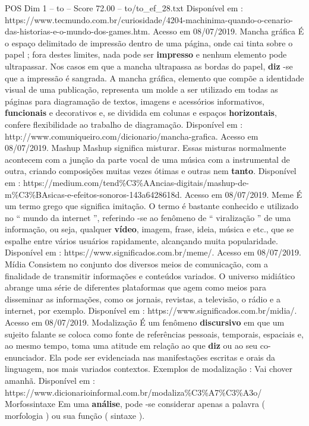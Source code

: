 \begin{textsample}{POS Dim 1 – to – Score 72.00 – to/to\_ef\_28.txt}
Disponível em : https://www.tecmundo.com.br/curiosidade/4204-machinima-quando-o-cenario-das-historias-e-o-mundo-dos-games.htm.
Acesso em 08/07/2019.
Mancha gráfica É o espaço delimitado de impressão dentro de uma página, onde cai tinta sobre o papel ; fora destes limites, nada pode ser \textbf{impresso} e nenhum elemento pode ultrapassar.
Nos casos em que a mancha ultrapassa as bordas do papel, \textbf{diz} -se que a impressão é sangrada.
A mancha gráfica, elemento que compõe a identidade visual de uma publicação, representa um molde a ser utilizado em todas as páginas para diagramação de textos, imagens e acessórios informativos, \textbf{funcionais} e decorativos e, se dividida em colunas e espaços \textbf{horizontais}, confere flexibilidade ao trabalho de diagramação.
Disponível em : http://www.comuniqueiro.com/dicionario/mancha-grafica.
Acesso em 08/07/2019.
Mashup Mashup significa misturar.
Essas misturas normalmente acontecem com a junção da parte vocal de uma música com a instrumental de outra, criando composições muitas vezes ótimas e outras nem \textbf{tanto}.
Disponível em : https://medium.com/tend\%C3\%AAncias-digitais/mashup-de-m\%C3\%BAsicas-e-efeitos-sonoros-143a6428618d.
Acesso em 08/07/2019.
Meme É um termo grego que significa imitação.
O termo é bastante conhecido e utilizado no “ mundo da internet ”, referindo -se ao fenômeno de “ viralização ” de uma informação, ou seja, qualquer \textbf{vídeo}, imagem, frase, ideia, música e etc., que se espalhe entre vários usuários rapidamente, alcançando muita popularidade.
Disponível em : https://www.significados.com.br/meme/.
Acesso em 08/07/2019.
Mídia Consistem no conjunto dos diversos meios de comunicação, com a finalidade de transmitir informações e conteúdos variados.
O universo midiático abrange uma série de diferentes plataformas que agem como meios para disseminar as informações, como os jornais, revistas, a televisão, o rádio e a internet, por exemplo.
Disponível em : https://www.significados.com.br/midia/.
Acesso em 08/07/2019.
Modalização É um fenômeno \textbf{discursivo} em que um sujeito falante se coloca como fonte de referências pessoais, temporais, espaciais e, ao mesmo tempo, toma uma atitude em relação ao que \textbf{diz} ou ao seu co-enunciador.
Ela pode ser evidenciada nas manifestações escritas e orais da linguagem, nos mais variados contextos.
Exemplos de modalização : Vai chover amanhã.
Disponível em : https://www.dicionarioinformal.com.br/modaliza\%C3\%A7\%C3\%A3o/ Morfossintaxe Em uma \textbf{análise}, pode -se considerar apenas a palavra ( morfologia ) ou sua função ( sintaxe ).

\end{textsample}
